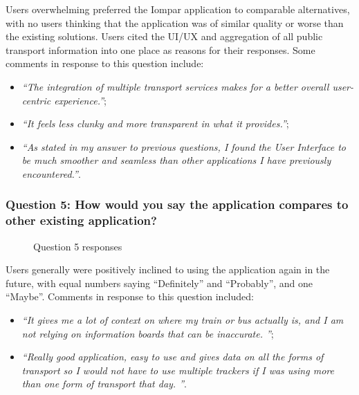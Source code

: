 \documentclass[a4paper,11pt]{report}
\begin{document}
Users overwhelming preferred the Iompar application to comparable alternatives, with no users thinking that the application was of similar quality or worse than the existing solutions.
Users cited the UI/UX and aggregation of all public transport information into one place as reasons for their responses.
Some comments in response to this question include:
\begin{itemize}
    \item   \textit{``The integration of multiple transport services makes for a better overall user-centric experience.''};
    \item   \textit{``It feels less clunky and more transparent in what it provides.''};
    \item   \textit{``As stated in my answer to previous questions, I found the User Interface to be much smoother and seamless than other applications I have previously encountered.''}.
\end{itemize}

\subsubsection{Question 5: How would you say the application compares to other existing application?}
\begin{figure}[H]
    \centering
    \caption{Question 5 responses}
\end{figure}

Users generally were positively inclined to using the application again in the future, with equal numbers saying ``Definitely'' and ``Probably'', and one ``Maybe''.
Comments in response to this question included:
\begin{itemize}
    \item   \textit{``It gives me a lot of context on where my train or bus actually is, and I am not relying on information boards that can be inaccurate. ''};
    \item   \textit{``Really good application, easy to use and gives data on all the forms of transport so I would not have to use multiple trackers if I was using more than one form of transport that day. ''}.
\end{itemize}
\end{document}
